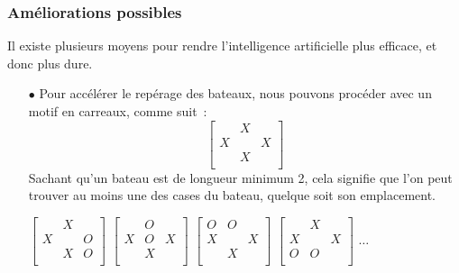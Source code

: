 \documentclass[12pt]{article}
\begin{document}
\subsubsection{Améliorations possibles}
Il existe plusieurs moyens pour rendre l'intelligence artificielle plus
efficace, et donc plus dure.
\bigskip
\begin{itemize}
      \item[$\bullet$] Pour accélérer le repérage des bateaux, nous pouvons
            procéder avec
            un
            motif en carreaux, comme suit :
            \[
                  \begin{bmatrix}
                          & X &   \\
                        X &   & X \\
                          & X &   \\
                  \end{bmatrix}
            \]
            Sachant qu'un bateau est de longueur minimum 2, cela signifie
            que
            l'on peut
            trouver au moins une des cases du bateau, quelque soit son
            emplacement.

            \bigskip
            $
                  \begin{bmatrix}
                          & X &   \\
                        X &   & O \\
                          & X & O \\
                  \end{bmatrix}
            $
            $
                  \begin{bmatrix}
                          & O &   \\
                        X & O & X \\
                          & X &   \\
                  \end{bmatrix}
            $
            $
                  \begin{bmatrix}
                        O & O &   \\
                        X &   & X \\
                          & X &   \\
                  \end{bmatrix}
            $
            $
                  \begin{bmatrix}
                          & X &   \\
                        X &   & X \\
                        O & O &   \\
                  \end{bmatrix}
            $
            $\ldots$


\end{itemize}
\end{document}
